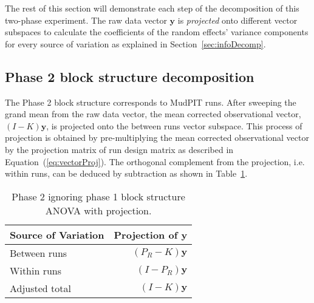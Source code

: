 \documentclass[article]{jss}
\begin{document}
The rest of this section will demonstrate each step of the decomposition of this two-phase experiment. The raw data vector $\bm{y}$ is \emph{projected} onto different vector subspaces to calculate the coefficients of the random effects' variance components for every source of variation as explained in Section~\ref{sec:infoDecomp}.

\subsection{Phase 2 block structure decomposition}
The Phase 2 block structure corresponds to MudPIT runs. After sweeping the grand mean from the raw data vector, the mean corrected observational vector, $(I-K)\bm{y}$, is projected onto the between runs vector subspace. This process of projection is obtained by pre-multiplying the mean corrected observational vector by the projection matrix of run design matrix as described in Equation~(\ref{eq:vectorProj}). The orthogonal complement from the projection, i.e. within runs, can be deduced by subtraction as shown in Table~\ref{tab:block2Projection}.

\begin{table}[ht]
\centering
\caption{Phase 2 ignoring phase 1 block structure ANOVA with projection.}
\begin{tabular}[t]{lr}
\hline
\multicolumn{1}{l}{Source of Variation}  & \multicolumn{1}{l}{Projection of $\bm{y}$}\\
\hline
Between runs 					&$(P_R - K)\bm{y}$ \\
Within runs 					&$(I-P_R)\bm{y}$ \\
\hline
Adjusted total  				&$(I-K)\bm{y}$  \\
\hline
\end{tabular}
\label{tab:block2Projection}
\end{table}
\end{document}
